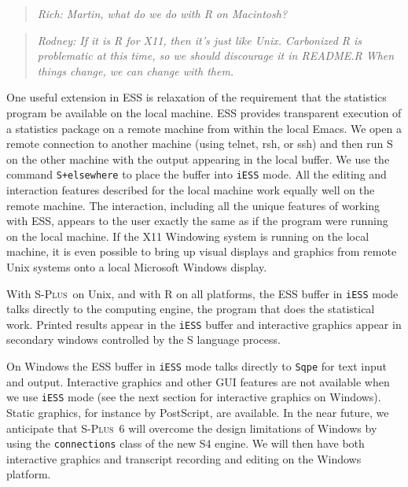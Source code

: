 \documentclass{article}
\newcommand*{\Splus}{\textsc{S-Plus}}
\newcommand{\stexttt}[1]{{\small\texttt{#1}}}
\newenvironment{Comment}{\begin{quote}\small\itshape }{\end{quote}}
\begin{document}
\begin{Comment} Rich: Martin, what do we do with R on Macintosh?\end{Comment}
\begin{Comment} Rodney: If it is R for X11, then it's just like Unix.  
Carbonized R is problematic at this time, so we should discourage it in 
README.R  When things change, we can change with them.\end{Comment}

One useful extension in ESS is relaxation of the requirement that the
statistics program be available on the local machine.  ESS provides
transparent execution of a statistics package on a remote machine from
within the local Emacs.  We open a remote connection to another
machine (using telnet, rsh, or ssh) and then run S on the other
machine with the output appearing in the local buffer.  We use the
command \stexttt{S+elsewhere} to place the buffer into \stexttt{iESS}
mode.
All the editing and interaction features described for the local
machine work equally well on the remote machine.  The interaction,
including all the unique features of working with ESS, appears to the
user exactly the same as if the program were running on the local
machine.  If the X11 Windowing system is running on the local machine,
it is even possible to bring up visual displays and graphics from
remote Unix systems onto a local Microsoft Windows display.

With \Splus\ on Unix, and with R on all platforms, the ESS buffer in
\stexttt{iESS} mode talks directly to the computing engine, the
program that does the statistical work.  Printed results appear in the
\stexttt{iESS} buffer and interactive graphics appear in secondary
windows controlled by the S language process.

On Windows the ESS buffer in \stexttt{iESS} mode talks directly to
\stexttt{Sqpe} for text input and output.  Interactive graphics and
other GUI features are not available when we use \stexttt{iESS} mode
(see the next section for interactive graphics on Windows).
Static graphics, for instance by PostScript, are available.  In the
near future, we anticipate that \Splus\ 6 will overcome the design
limitations of Windows by using the \stexttt{connections} class of the
new S4 engine.  We will then have both interactive graphics and transcript
recording and editing on the Windows platform.
\end{document}
